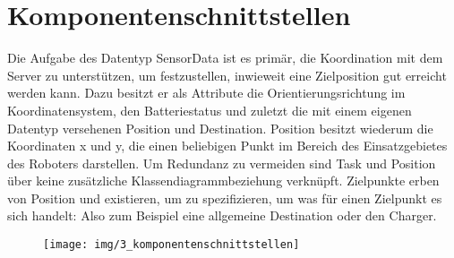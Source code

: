 \section{Komponentenschnittstellen}
Die Aufgabe des Datentyp SensorData ist es primär, die Koordination mit dem Server zu unterstützen, um festzustellen, inwieweit eine Zielposition gut erreicht werden kann. Dazu besitzt er als Attribute die Orientierungsrichtung im Koordinatensystem, den Batteriestatus und zuletzt die mit einem eigenen Datentyp versehenen Position und Destination. Position besitzt wiederum die Koordinaten x und y, die einen beliebigen Punkt im Bereich des Einsatzgebietes des Roboters darstellen. Um Redundanz zu vermeiden sind Task und Position über keine zusätzliche Klassendiagrammbeziehung verknüpft. Zielpunkte erben von Position und existieren, um zu spezifizieren, um was für einen Zielpunkt es sich handelt: Also zum Beispiel eine allgemeine Destination oder den Charger.
	
	\begin{figure}[H]
		\centering
		\texttt{[image: img/3\_komponentenschnittstellen]}
		\label{Komponentenschnittstellen}
	\end{figure}
